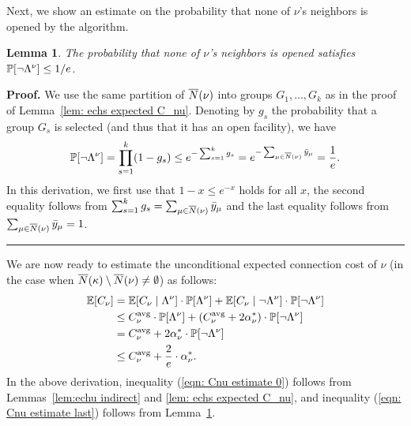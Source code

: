 \documentclass[oneside,final]{ucr}
\newtheorem{lemma}[theorem]{Lemma}
\newenvironment{proof}[1][Proof]{\textbf{#1.} }{\ \rule{0.5em}{0.5em}}
\begin{document}
Next, we show an estimate on the probability that none of $\nu$'s
neighbors is opened by the algorithm.

\begin{lemma}\label{lem: probability of not Lambda^nu}
The probability that none of $\nu$'s neighbors is opened satisfies
$\mathbb{P}[\neg\Lambda^\nu] \le 1/e$.
\end{lemma}

\begin{proof}
We use the same partition of ${\overline{N}}(\nu)$ into groups $G_1,...,G_k$ as
in the proof of Lemma~\ref{lem: echs expected C_nu}. Denoting by
$g_s$ the probability that a group $G_s$ is selected (and thus that it
has an open facility), we have
%
\begin{equation*}
\mathbb{P}[\neg\Lambda^\nu] = \prod_{s=1}^k (1 - g_s)
			\le e^{- \sum_{s=1}^k g_s}
			= e^{-\sum_{\mu \in {\overline{N}}(\nu)} {\bar y}_{\mu}}
			= \frac{1}{e}.
\end{equation*}
%
In this derivation, we first use that $1-x\le e^{-x}$ holds for all $x$,
the second equality follows from $\sum_{s=1}^k g_s = \sum_{\mu \in {\overline{N}}(\nu)} {\bar y}_{\mu}$
and the last equality follows from 
$\sum_{\mu \in {\overline{N}}(\nu)} {\bar y}_{\mu} = 1$.
\end{proof}

We are now ready to estimate the unconditional expected connection cost of $\nu$
(in the case when ${\overline{N}}(\kappa)\setminus {\overline{N}}(\nu)\neq\emptyset$)
as follows:
%
\begin{align}
  \notag
  \mathbb{E}[C_\nu] &= \mathbb{E}[C_{\nu} \mid \Lambda^\nu] \cdot \mathbb{P}[\Lambda^\nu] 
	+ \mathbb{E}[C_{\nu} \mid \neg \Lambda^\nu] \cdot	\mathbb{P}[\neg \Lambda^\nu]
  \\
  &\leq C^{{\mbox{\scriptsize\rm avg}}}_{\nu} \cdot \mathbb{P}[\Lambda^\nu] 
		+ (C^{{\mbox{\scriptsize\rm avg}}}_{\nu} + 2\alpha_{\nu}^\ast)  \cdot \mathbb{P}[\neg \Lambda^\nu]
  \label{eqn: Cnu estimate 0}
  \\
  &= C^{{\mbox{\scriptsize\rm avg}}}_{\nu} 
	+  2\alpha_{\nu}^\ast \cdot \mathbb{P}[\neg \Lambda^\nu]
		\notag
	\\
	&\le C^{{\mbox{\scriptsize\rm avg}}}_{\nu} + \frac{2}{e}\cdot\alpha_{\nu}^\ast.
	  \label{eqn: Cnu estimate last}
\end{align}
%
In the above derivation, inequality (\ref{eqn: Cnu estimate 0})
follows from Lemmas~\ref{lem:echu indirect} and \ref{lem: echs expected C_nu}, 
and inequality (\ref{eqn: Cnu estimate last}) follows from
Lemma~\ref{lem: probability of not Lambda^nu}.

\medskip
\end{document}

